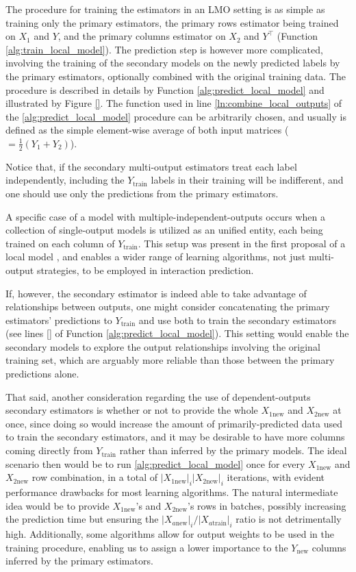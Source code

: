 \documentclass[conference]{IEEEtran}
\begin{document}
The procedure for training the estimators in an LMO setting is as simple as training only the primary estimators, the primary rows estimator being trained on $X_1$ and $Y$, and the primary columns estimator on $X_2$ and $Y^\intercal$ (Function \ref{alg:train_local_model}). The prediction step is however more complicated, involving the training of the secondary models on the newly predicted labels by the primary estimators, optionally combined with the original training data. The procedure is described in details by Function \ref{alg:predict_local_model} and illustrated by Figure \ref{}. The \KwCombine function used in line \ref{ln:combine_local_outputs} of the \ref{alg:predict_local_model} procedure can be arbitrarily chosen, and usually is defined as the simple element-wise average of both input matrices ( $= \frac{1}{2}(Y_1 + Y_2)$).

Notice that, if the secondary multi-output estimators treat each label independently, including the $Y_\text{train}$ labels in their training will be indifferent, and one should use only the predictions from the primary estimators.

A specific case of a model with multiple-independent-outputs occurs when a collection of single-output models is utilized as an unified entity, each being trained on each column of $Y_\text{train}$. This setup was present in the first proposal of a local model \cite{}, and enables a wider range of learning algorithms, not just multi-output strategies, to be employed in interaction prediction.

If, however, the secondary estimator is indeed able to take advantage of relationships between outputs, one might consider concatenating the primary estimators' predictions to $Y_\text{train}$ and use both to train the secondary estimators (see lines \ref{} of Function \ref{alg:predict_local_model}). This setting would enable the secondary models to explore the output relationships involving the original training set, which are arguably more reliable than those between the primary predictions alone.

That said, another consideration regarding the use of dependent-outputs secondary estimators is whether or not to provide the whole $X_{1\text{new}}$ and $X_{2\text{new}}$ at once, since doing so would increase the amount of primarily-predicted data used to train the secondary estimators, and it may be desirable to have more columns coming directly from $Y_\text{train}$ rather than inferred by the primary models. The ideal scenario then would be to run \ref{alg:predict_local_model} once for every $X_{1\text{new}}$ and $X_{2\text{new}}$ row combination, in a total of $|X_{1\text{new}}|_i|X_{2\text{new}}|_i$ iterations, with evident performance drawbacks for most learning algorithms. The natural intermediate idea would be to provide $X_{1\text{new}}$'s and $X_{2\text{new}}$'s rows in batches, possibly increasing the prediction time but ensuring the $|X_{a\text{new}}|_i/|X_{a\text{train}}|_i$ ratio is not detrimentally high. Additionally, some algorithms allow for output weights to be used in the training procedure, enabling us to assign a lower importance to the $Y_{\text{new}}$ columns inferred by the primary estimators.
\end{document}

